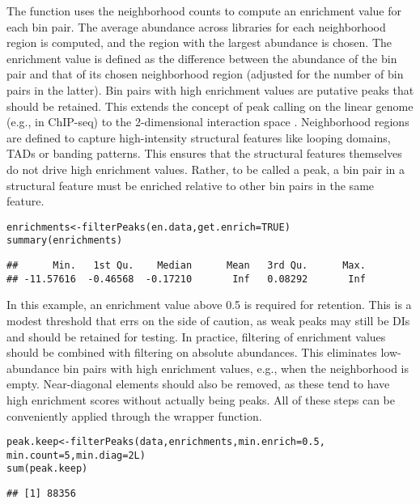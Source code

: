 \documentclass{report}\usepackage[]{graphicx}\usepackage[usenames,dvipsnames]{color}
\newcommand{\hlnum}[1]{\textcolor[rgb]{0.816,0.125,0.439}{#1}}%
\newcommand{\hlstd}[1]{\textcolor[rgb]{0.251,0.251,0.251}{#1}}%
\newcommand{\hlkwb}[1]{\textcolor[rgb]{0,0,0}{#1}}%
\newcommand{\hlkwc}[1]{\textcolor[rgb]{0.251,0.251,0.251}{#1}}%
\newcommand{\hlkwd}[1]{\textcolor[rgb]{0.878,0.439,0.125}{#1}}%
\newenvironment{knitrout}{}{} %
\begin{document}
The  function uses the neighborhood counts to compute an enrichment value for each bin pair.
The average abundance across libraries for each neighborhood region is computed, and the region with the largest abundance is chosen.
The enrichment value is defined as the difference between the abundance of the bin pair and that of its chosen neighborhood region (adjusted for the number of bin pairs in the latter).
Bin pairs with high enrichment values are putative peaks that should be retained.
This extends the concept of peak calling on the linear genome (e.g., in ChIP-seq) to the 2-dimensional interaction space \cite{rao2014kilobase}.
Neighborhood regions are defined to capture high-intensity structural features like looping domains, TADs or banding patterns.
This ensures that the structural features themselves do not drive high enrichment values.
Rather, to be called a peak, a bin pair in a structural feature must be enriched relative to other bin pairs in the same feature.

\begin{knitrout}
\color{fgcolor}\begin{kframe}
\begin{alltt}
\hlstd{enrichments} \hlkwb{<-} \hlkwd{filterPeaks}\hlstd{(en.data,} \hlkwc{get.enrich}\hlstd{=}\hlnum{TRUE}\hlstd{)}
\hlkwd{summary}\hlstd{(enrichments)}
\end{alltt}
\begin{verbatim}
##      Min.   1st Qu.    Median      Mean   3rd Qu.      Max. 
## -11.57616  -0.46568  -0.17210       Inf   0.08292       Inf
\end{verbatim}
\end{kframe}
\end{knitrout}

In this example, an enrichment value above 0.5 is required for retention.
This is a modest threshold that errs on the side of caution, as weak peaks may still be DIs and should be retained for testing.
In practice, filtering of enrichment values should be combined with filtering on absolute abundances.
This eliminates low-abundance bin pairs with high enrichment values, e.g., when the neighborhood is empty.
Near-diagonal elements should also be removed, as these tend to have high enrichment scores without actually being peaks.
All of these steps can be conveniently applied through the  wrapper function.

\begin{knitrout}
\color{fgcolor}\begin{kframe}
\begin{alltt}
\hlstd{peak.keep} \hlkwb{<-} \hlkwd{filterPeaks}\hlstd{(data, enrichments,} \hlkwc{min.enrich}\hlstd{=}\hlnum{0.5}\hlstd{,}
                         \hlkwc{min.count}\hlstd{=}\hlnum{5}\hlstd{,} \hlkwc{min.diag}\hlstd{=}\hlnum{2L}\hlstd{)}
\hlkwd{sum}\hlstd{(peak.keep)}
\end{alltt}
\begin{verbatim}
## [1] 88356
\end{verbatim}
\end{kframe}
\end{knitrout}
\end{document}

